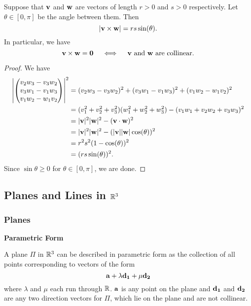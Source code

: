 \documentclass[10pt, a4paper]{article}
\begin{document}
\begin{lemma}
    Suppose that $\mathbf{v}$ and $\mathbf{w}$ are vectors of length $r > 0$ and $s > 0$ respectively. Let $\theta \in [0, \pi]$ be the angle between them. Then
    \[
    |\mathbf{v \times w}| = rs\sin(\theta).
    \]
    In particular, we have
    \[
    \mathbf{v \times w = 0}\quad\iff\quad\mathbf{v}\text{ and }\mathbf{w}\text{ are collinear}.
    \]

    \begin{proof}
        We have
        \begin{align*}
            \left|\begin{pmatrix}
                v_2 w_3 - v_3 w_2 \\
                v_3 w_1 - v_1 w_3 \\
                v_1 w_2 - w_1 v_2
            \end{pmatrix}\right| ^ 2
            &= (v_2w_3 - v_3w_2) ^ 2 + (v_3w_1 - v_1w_3) ^ 2 + (v_1w_2 - w_1v_2) ^ 2 \\
            &= (v_1 ^ 2 + v_2 ^ 2 + v_3 ^ 2)(w_1 ^ 2 + w_2 ^ 2 + w_3 ^ 2) - (v_1w_1 + v_2w_2 + v_3w_3) ^ 2 \\
            &= |\mathbf{v}| ^ 2 |\mathbf{w}| ^ 2 - (\mathbf{v \cdot w}) ^ 2 \\
            &= |\mathbf{v}| ^ 2 |\mathbf{w}| ^ 2 - (|\mathbf{v}||\mathbf{w}|\cos(\theta)) ^ 2 \\
            &= r^2s^2(1 - \cos(\theta)) ^ 2 \\
            &= (rs\sin(\theta)) ^ 2.
        \end{align*}
        Since $\sin\theta \geq 0$ for $\theta \in [0, \pi]$, we are done.
    \end{proof}
\end{lemma}

\subsection{Planes and Lines in \texorpdfstring{$\mathbb{R} ^ 3$}{}}
\subsubsection{Planes}

\textbf{Parametric Form}

A plane $\Pi$ in $\mathbb{R} ^ 3$ can be described in parametric form as the collection of all points corresponding to vectors of the form
\[
\mathbf{a} + \lambda\mathbf{d_1} + \mu\mathbf{d_2}
\]
where $\lambda$ and $\mu$ each run through $\mathbb{R}$. $\mathbf{a}$ is any point on the plane and $\mathbf{d_1}$ and $\mathbf{d_2}$ are any two direction vectors for $\Pi$, which lie on the plane and are not collinear.
\end{document}
